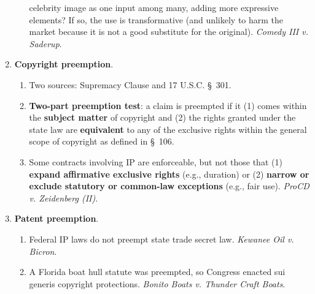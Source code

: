 \begin{enumerate}
\begin{enumerate}
        celebrity image as one input among many, adding more expressive 
        elements? If so, the use is transformative (and unlikely to harm the 
        market because it is not a good substitute for the original).  
        \emph{Comedy III v. Saderup}.
    \end{enumerate}
    \item \textbf{Copyright preemption}.
    \begin{enumerate}
        \item Two sources: Supremacy Clause and 17 U.S.C. \S\ 301.
        \item \textbf{Two-part preemption test}: a claim is preempted if it 
        (1) comes within the \textbf{subject matter} of copyright and (2) the 
        rights granted under the state law are \textbf{equivalent} to any of 
        the exclusive rights within the general scope of copyright as defined 
        in \S\ 106.
        \item Some contracts involving IP are enforceable, but not those that 
        (1) \textbf{expand affirmative exclusive rights} (e.g., duration) or 
        (2) \textbf{narrow or exclude statutory or common-law exceptions} 
        (e.g., fair use). \emph{ProCD v. Zeidenberg (II)}.
    \end{enumerate}
    \item \textbf{Patent preemption}.
    \begin{enumerate}
        \item Federal IP laws do not preempt state trade secret law.  
        \emph{Kewanee Oil v. Bicron}.
        \item A Florida boat hull statute was preempted, so Congress enacted 
        sui generis copyright protections. \emph{Bonito Boats v. Thunder Craft 
        Boats}.
    \end{enumerate}
\end{enumerate}
